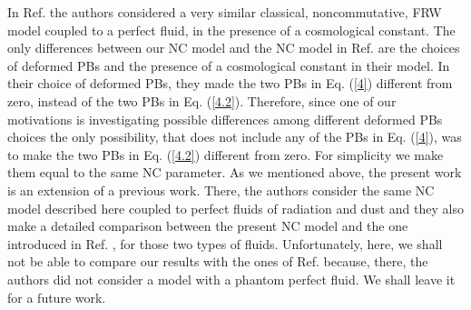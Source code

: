 \documentclass[12pt]{article}
\newcommand{\0}{{(0)}}
\newcommand{\1}{{(1)}}
\newcommand{\2}{{(2)}}
\begin{document}
In Ref. \cite{gil} the authors considered a very similar classical, noncommutative, FRW model coupled to a perfect fluid, 
in the presence of a cosmological constant. The only differences between our NC model and the NC model in Ref. \cite{gil} are the choices of deformed PBs and the 
presence of a cosmological constant in their model.
In their choice of deformed PBs, they made the two PBs in Eq. (\ref{4}) different from zero, instead of the two PBs in Eq. (\ref{4.2}). 
Therefore, since one of our motivations is investigating possible differences among different 
deformed PBs choices the only possibility, that does not include any of the PBs in Eq. (\ref{4}), was to make the two PBs in Eq. (\ref{4.2}) different from zero. For
simplicity we make them equal to the same NC parameter.
As we mentioned above, the present work is an extension of a previous work\cite{gil2}.
There, the authors consider the same NC model described here coupled to perfect fluids of radiation and dust 
and they also make a detailed comparison between the present NC model and the one introduced in Ref. \cite{gil},
for those two types of fluids. Unfortunately, here, we shall not be able to compare our results with the ones of
Ref. \cite{gil} because, there, the authors did not consider a model with a phantom perfect fluid. We shall
leave it for a future work.
\end{document}

